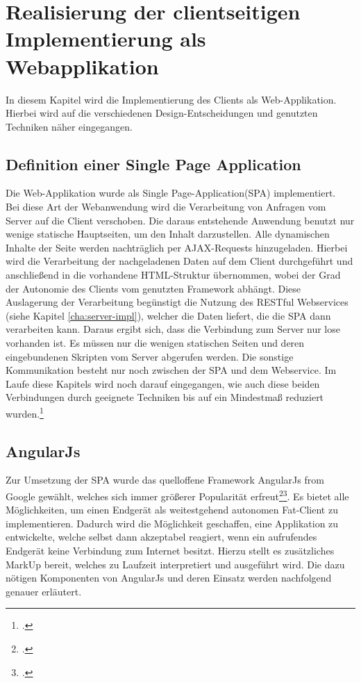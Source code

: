 \chapter{Realisierung der clientseitigen Implementierung als Webapplikation}
\label{cha:web-app}
In diesem Kapitel wird die Implementierung des Clients als Web-Applikation. Hierbei wird auf die verschiedenen Design-Entscheidungen und genutzten Techniken näher eingegangen. 
\section{Definition einer Single Page Application}
\label{sec:Definition-SPA}
Die Web-Applikation wurde als \ac{Single Page-Application}(SPA) implementiert. \\Bei diese Art der Webanwendung wird die Verarbeitung von Anfragen vom Server auf die Client verschoben. Die daraus entstehende Anwendung benutzt nur wenige statische Hauptseiten, um den Inhalt darzustellen. Alle dynamischen Inhalte der Seite werden nachträglich per AJAX-Requests hinzugeladen.  Hierbei wird die Verarbeitung der nachgeladenen Daten auf dem Client durchgeführt und anschließend in die vorhandene HTML-Struktur übernommen, wobei der Grad der Autonomie des Clients vom genutzten Framework abhängt. Diese Auslagerung der Verarbeitung begünstigt die Nutzung des RESTful Webservices (siehe Kapitel \ref{cha:server-impl}), welcher die Daten liefert, die die SPA dann verarbeiten kann. Daraus ergibt sich, dass die Verbindung zum Server nur lose vorhanden ist. Es müssen nur  die wenigen statischen Seiten und deren eingebundenen Skripten vom Server abgerufen werden. Die sonstige Kommunikation besteht nur noch zwischen der SPA und dem Webservice. Im Laufe diese Kapitels wird noch darauf eingegangen, wie auch diese beiden Verbindungen durch geeignete Techniken bis auf ein Mindestmaß reduziert wurden.\footcite[S. 31f.]{book:AngularJs:Steyer2015}
\section{AngularJs}
\label{sec:AngularJs}
Zur Umsetzung der SPA wurde das quelloffene Framework AngularJs from Google gewählt, welches sich immer größerer Popularität erfreut\footcite{online:angularjs-popularity}\footcite[S. 33]{book:AngularJs:Steyer2015}. Es bietet alle Möglichkeiten, um einen Endgerät als weitestgehend autonomen \ac{Fat-Client} zu implementieren. Dadurch wird die Möglichkeit geschaffen, eine Applikation zu entwickelte, welche selbst dann akzeptabel reagiert, wenn ein aufrufendes Endgerät keine Verbindung zum Internet besitzt. Hierzu stellt es zusätzliches \ac{MarkUp} bereit, welches zu Laufzeit interpretiert und ausgeführt wird. Die dazu nötigen Komponenten von AngularJs und deren Einsatz werden nachfolgend genauer erläutert.

